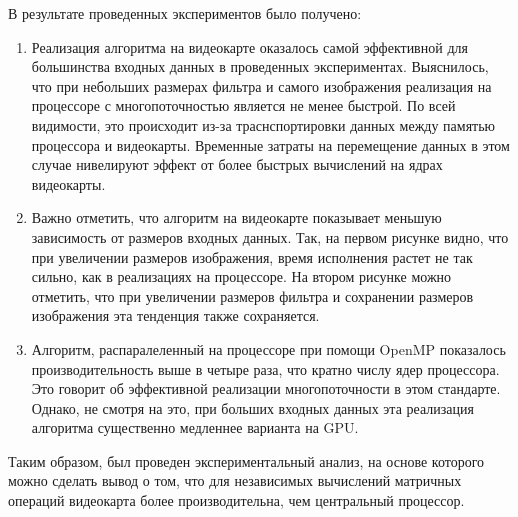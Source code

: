 \clearpage
{}

В результате проведенных экспериментов было получено:

\begin{enumerate}
    \item Реализация алгоритма на видеокарте оказалось самой эффективной для большинства входных данных в проведенных экспериментах. 
    Выяснилось, что при небольших размерах фильтра и самого изображения реализация на процессоре с многопоточностью является не менее быстрой. 
    По всей видимости, это происходит из-за траснспортировки данных между памятью процессора и видеокарты. Временные затраты на перемещение 
    данных в этом случае нивелируют эффект от более быстрых вычислений на ядрах видеокарты.
    
    \item Важно отметить, что алгоритм на видеокарте показывает меньшую зависимость от размеров входных данных. Так, на первом рисунке видно, 
    что при увеличении размеров изображения, время исполнения растет не так сильно, как в реализациях на процессоре. На втором рисунке можно 
    отметить, что при увеличении размеров фильтра и сохранении размеров изображения эта тенденция также сохраняется.
    
    \item Алгоритм, распаралеленный на процессоре при помощи OpenMP показалось производительность выше в четыре раза, что кратно числу ядер 
    процессора. Это говорит об эффективной реализации многопоточности в этом стандарте. Однако, не смотря на это, при больших входных данных 
    эта реализация алгоритма существенно медленнее варианта на GPU.
    
\end{enumerate}

Таким образом, был проведен экспериментальный анализ, на основе которого можно сделать вывод о том, что для независимых вычислений матричных 
операций видеокарта более производительна, чем центральный процессор.
\clearpage